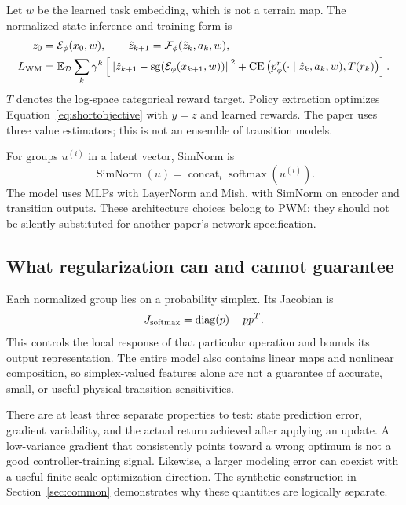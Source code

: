 Let $w$ be the learned task embedding, which is not a terrain map. The normalized
state inference and training form is
\begin{align}
z_0&=\mathcal E_\phi(x_0,w),\qquad
\hat z_{k+1}=\mathcal F_\phi(\hat z_k,a_k,w),\\
L_{\rm WM}&=\mathbb E_{\mathcal D}\sum_k\gamma^k\left[
\left\lVert\hat z_{k+1}-\operatorname{sg}(\mathcal E_\phi(x_{k+1},w))\right\rVert^2
+\operatorname{CE}\big(p_\phi^r(\cdot\mid\hat z_k,a_k,w),T(r_k)\big)\right].
\end{align}
$T$ denotes the log-space categorical reward target. Policy extraction optimizes
Equation~\eqref{eq:shortobjective} with $y=z$ and learned rewards. The paper uses
three value estimators; this is not an ensemble of transition models.

For groups $u^{(i)}$ in a latent vector, SimNorm is
\begin{equation}
\operatorname{SimNorm}(u)=\operatorname{concat}_i
\operatorname{softmax}(u^{(i)}).
\end{equation}
The model uses MLPs with LayerNorm and Mish, with SimNorm on encoder and
transition outputs. These architecture choices belong to PWM; they should not
be silently substituted for another paper's network specification.

\subsection{What regularization can and cannot guarantee}
Each normalized group lies on a probability simplex. Its Jacobian is
\begin{equation}
J_{\rm softmax}=\operatorname{diag}(p)-pp^T.
\end{equation}
This controls the local response of that particular operation and bounds its
output representation. The entire model also contains linear maps and nonlinear
composition, so simplex-valued features alone are not a guarantee of accurate,
small, or useful physical transition sensitivities.

There are at least three separate properties to test: state prediction error,
gradient variability, and the actual return achieved after applying an update.
A low-variance gradient that consistently points toward a wrong optimum is not
a good controller-training signal. Likewise, a larger modeling error can coexist
with a useful finite-scale optimization direction. The synthetic construction
in Section~\ref{sec:common} demonstrates why these quantities are logically separate.

